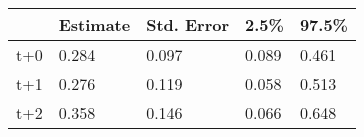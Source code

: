 \begin{tabular}{lllll}
  \toprule
  & Estimate & Std. Error & 2.5\% & 97.5\% \\ 
  \midrule
t+0 & 0.284 & 0.097 & 0.089 & 0.461 \\ 
  t+1 & 0.276 & 0.119 & 0.058 & 0.513 \\ 
  t+2 & 0.358 & 0.146 & 0.066 & 0.648 \\ 
   \bottomrule
\end{tabular}
